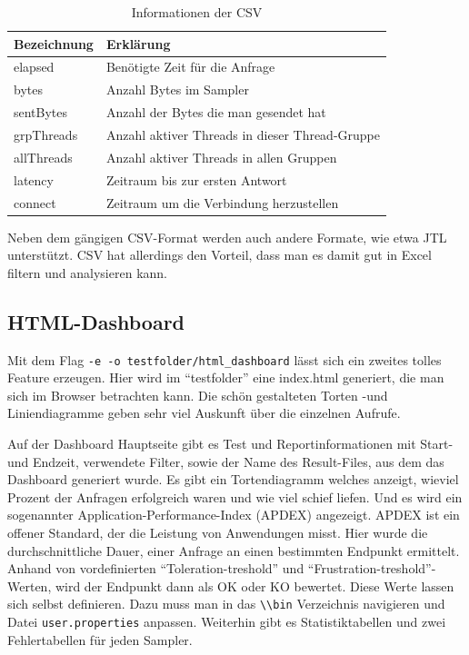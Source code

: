 \documentclass[a4paper,12pt]{article}
\newcommand{\codeInLine}[1]{%
\colorbox{graybackgroundColor}{\lstinline{#1}} %
}
\begin{document}
\begin{table}[H]
	\centering
	\begin{tabular}{|l|l|}
		\hline
		\textbf{Bezeichnung} & \textbf{Erklärung} \\
		\hline
		elapsed & Benötigte Zeit für die Anfrage \\
		bytes & Anzahl Bytes im Sampler \\
		sentBytes & Anzahl der Bytes die man gesendet hat \\
		grpThreads & Anzahl aktiver Threads in dieser Thread-Gruppe \\
		allThreads & Anzahl aktiver Threads in allen Gruppen \\
		latency & Zeitraum bis zur ersten Antwort \\
		connect & Zeitraum um die Verbindung herzustellen \\
		\hline
	\end{tabular}
	\caption[tab_csv_file]{Informationen der CSV}
	\label{tab_csv_file}
\end{table}

Neben dem gängigen CSV-Format werden auch andere Formate, wie etwa JTL unterstützt. CSV hat allerdings den Vorteil, dass man es damit gut in Excel filtern und analysieren kann.

\subsection{HTML-Dashboard}
\label{chap:html_dashboard}
Mit dem Flag \codeInLine{-e -o testfolder/html_dashboard} lässt sich ein zweites tolles Feature erzeugen. Hier wird im "`testfolder"' eine index.html generiert, die man sich im Browser betrachten kann.
Die schön gestalteten Torten -und Liniendiagramme geben sehr viel Auskunft über die einzelnen Aufrufe.

Auf der Dashboard Hauptseite gibt es Test und Reportinformationen mit Start- und Endzeit, verwendete Filter, sowie der Name des Result-Files, aus dem das Dashboard generiert wurde. Es gibt ein Tortendiagramm welches anzeigt, wieviel Prozent der Anfragen erfolgreich waren und wie viel schief liefen. 
Und es wird ein sogenannter Application-Performance-Index (APDEX) angezeigt. APDEX ist ein offener Standard, der die Leistung von Anwendungen misst. Hier wurde die durchschnittliche Dauer, einer Anfrage an einen bestimmten Endpunkt ermittelt. Anhand von vordefinierten "`Toleration-treshold"' und "`Frustration-treshold"'-Werten, wird der Endpunkt dann als OK oder KO bewertet. Diese Werte lassen sich selbst definieren. Dazu muss man in das \codeInLine{\\bin} Verzeichnis navigieren und Datei \codeInLine{user.properties} anpassen. Weiterhin gibt es Statistiktabellen und zwei Fehlertabellen für jeden Sampler.
\end{document}
